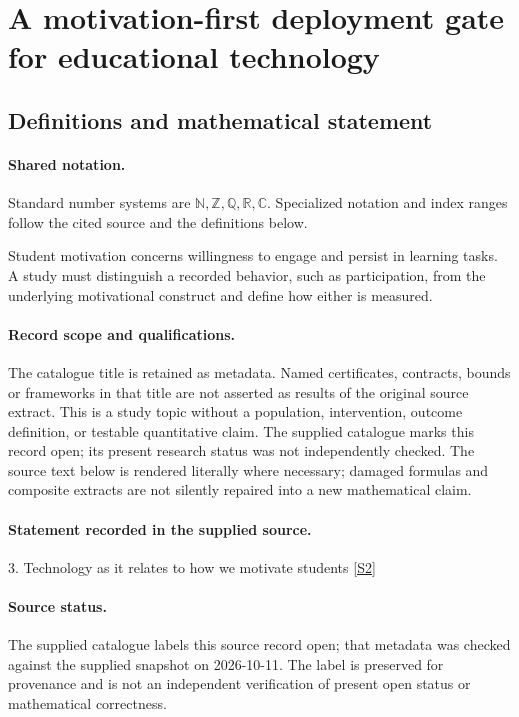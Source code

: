 \documentclass[11pt]{article}
\newcommand{\sref}[2]{\hyperlink{source:#1:#2}{[S#2]}}
\begin{document}
\section{A motivation-first deployment gate for educational technology}\label{statement}

\subsection{Definitions and mathematical statement}

\paragraph{Shared notation.}Standard number systems are $\mathbb N,\mathbb Z,\mathbb Q,\mathbb R,\mathbb C$. Specialized notation and index ranges follow the cited source and the definitions below.


Student motivation concerns willingness to engage and persist in learning tasks. A study must distinguish a recorded behavior, such as participation, from the underlying motivational construct and define how either is measured.
\paragraph{Record scope and qualifications.}
The catalogue title is retained as metadata. Named certificates, contracts, bounds or frameworks in that title are not asserted as results of the original source extract.
This is a study topic without a population, intervention, outcome definition, or testable quantitative claim. The supplied catalogue marks this record open; its present research status was not independently checked.
The source text below is rendered literally where necessary; damaged formulas and composite extracts are not silently repaired into a new mathematical claim.
\paragraph{Statement recorded in the supplied source.}
3. Technology as it relates to how we motivate students \sref{statement}{2}
\paragraph{Source status.}
The supplied catalogue labels this source record open; that metadata was checked against the supplied snapshot on 2026-10-11. The label is preserved for provenance and is not an independent verification of present open status or mathematical correctness.
\end{document}
